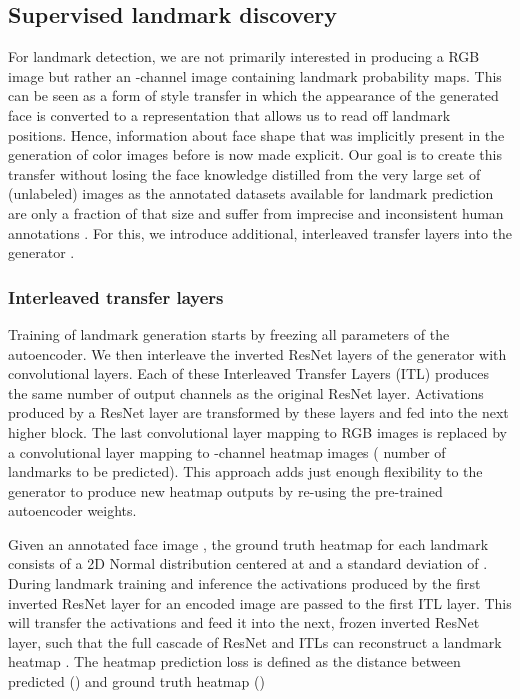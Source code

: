 \documentclass[10pt,twocolumn,letterpaper]{article}
\begin{document}
\vspace{-0.0cm}\subsection{Supervised landmark discovery}\vspace{-0.0cm} 



For landmark detection, we are not primarily interested in producing a RGB image but rather an -channel image containing landmark probability maps. This can be seen as a form of style transfer in which the appearance of the generated face is converted to a representation that allows us to read off landmark positions. Hence, information about face shape that was implicitly present in the generation of color images before is now made explicit.
Our goal is to create this transfer without losing the face knowledge distilled from the very large set of (unlabeled) images as the annotated datasets available for landmark prediction are only a fraction of that size and suffer from imprecise and inconsistent human annotations \cite{Dong2018}. For this, we introduce additional, interleaved transfer layers into the generator .

\vspace{-0.2cm}\subsubsection{Interleaved transfer layers}\vspace{-0.1cm}
Training of landmark generation starts by freezing all parameters of the autoencoder. We then interleave the inverted ResNet layers of the generator with  convolutional layers.  Each of these Interleaved Transfer Layers (ITL) produces the same number of output channels as the original ResNet layer. Activations produced by a ResNet layer are transformed by these layers and fed into the next higher block. The last convolutional layer mapping to RGB images is replaced by a convolutional layer mapping to -channel heatmap images ( number of landmarks to be predicted). This approach adds just enough flexibility to the generator to produce new heatmap outputs by re-using the pre-trained autoencoder weights.

Given an annotated face image , the ground truth heatmap  for each landmark  consists of a 2D Normal distribution centered at  and a standard deviation of . 
During landmark training and inference the activations  produced by the first inverted ResNet layer for an encoded image  are passed to the first ITL layer. This will transfer the activations and feed it into the next, frozen inverted ResNet layer, such that the full cascade of ResNet and ITLs can reconstruct a landmark heatmap .
The heatmap prediction loss  is defined as the  distance between predicted () and ground truth heatmap ()
\end{document}

